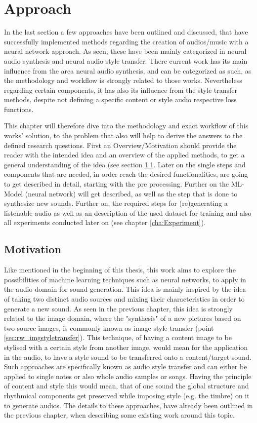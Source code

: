 \chapter{Approach}
\label{cha:Approach}
In the last section a few approaches have been outlined and discussed, that have successfully implemented methods regarding the creation of audios/music with a neural network approach. As seen, these have been mainly categorized in neural audio synthesis and neural audio style transfer. There current work has its main influence from the area neural audio synthesis, and can be categorized as such, as the methodology and workflow is strongly related to those works. Nevertheless regarding certain components, it has also its influence from the style transfer methods, despite not defining a specific content or style audio respective loss functions.

This chapter will therefore dive into the methodology and exact workflow of this works' solution, to the problem that also will help to derive the answers to the defined research questions. First an Overview/Motivation should provide the reader with the intended idea and an overview of the applied methods, to get a general understanding of the idea (see section \ref{sec:app_motivation}. Later on the single steps and components that are needed, in order reach the desired functionalities, are going to get described in detail, starting with the pre processing. Further on the ML-Model (neural network) will get described, as well as the step that is done to synthesize new sounds. Further on, the required steps for (re)generating a listenable audio as well as an description of the used dataset for training and also all experiments conducted later on (see chapter \ref{cha:Experiment}).

\section{Motivation}
\label{sec:app_motivation}
Like mentioned in the beginning of this thesis, this work aims to explore the possibilities of machine learning techniques such as neural networks, to apply in the audio domain for sound generation. This idea is mainly inspired by the idea of taking two distinct audio sources and mixing their characteristics in order to generate a new sound. As seen in the previous chapter, this idea is strongly related to the image domain, where the "synthesis" of a new pictures based on two source images, is commonly known as image style transfer (point \ref{sec:rw_imgstyletransfer}). This technique, of having a content image to be stylised with a certain style from another image, would mean for the application in the audio, to have a style sound to be transferred onto a content/target sound. Such approaches are specifically known as audio style transfer and can either be applied to single notes or also whole audio samples or songs. Having the principle of content and style this would mean, that of one sound the global structure and rhythmical components get preserved while imposing style (e.g. the timbre) on it to generate audios. The details to these approaches, have already been outlined in the previous chapter, when describing some existing work around this topic.

